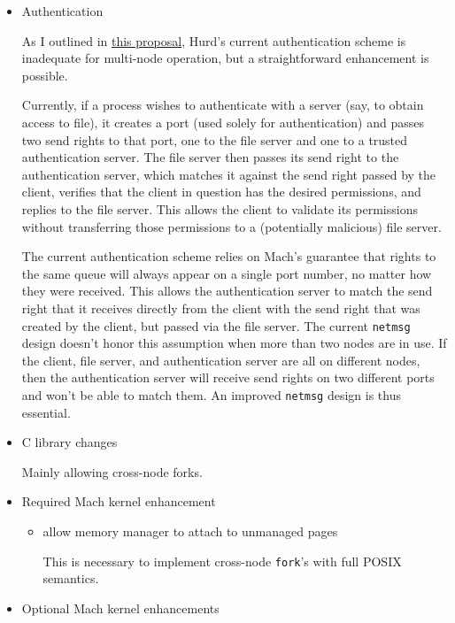 \documentclass{article}
\def\netmsg{{\tt netmsg}\xspace}
\begin{document}
\begin{itemize}
\item Authentication

As I outlined in
\href{http://lists.gnu.org/archive/html/bug-hurd/2016-09/msg00012.html}{this
  proposal}, Hurd's current authentication scheme is inadequate for
multi-node operation, but a straightforward enhancement is possible.

Currently, if a process wishes to authenticate with a server (say, to
obtain access to file), it creates a port (used solely for
authentication) and passes two send rights to that port, one to the
file server and one to a trusted authentication server.  The file
server then passes its send right to the authentication server, which
matches it against the send right passed by the client, verifies that
the client in question has the desired permissions, and replies to the
file server.  This allows the client to validate its permissions
without transferring those permissions to a (potentially malicious)
file server.

The current authentication scheme relies on Mach's guarantee that
rights to the same queue will always appear on a single port number,
no matter how they were received.  This allows the authentication
server to match the send right that it receives directly from the
client with the send right that was created by the client, but passed
via the file server.  The current \netmsg design doesn't honor this
assumption when more than two nodes are in use.  If the client, file
server, and authentication server are all on different nodes, then the
authentication server will receive send rights on two different ports
and won't be able to match them.  An improved \netmsg design is
thus essential.

\item C library changes

Mainly allowing cross-node forks.

\item Required Mach kernel enhancement

\begin{itemize}

\item allow memory manager to attach to unmanaged pages

  This is necessary to implement cross-node {\tt fork}'s with full POSIX semantics.

\end{itemize}

\item Optional Mach kernel enhancements


\end{itemize}
\end{document}
